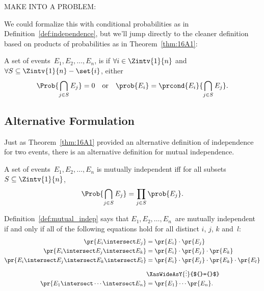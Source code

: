\begin{editingnotes}
MAKE INTO A PROBLEM:

We could formalize this with conditional probabilities
as in Definition~\ref{def:independence}, but we'll jump directly to
the cleaner definition based on products of probabilities as in
Theorem~\ref{thm:16A1}:

\begin{definition}\label{def:mutual_independence}
A set of events~$E_1, E_2, \dots, E_n$, is 
if $\forall i \in \Zintv{1}{n}$ and $\forall S \subseteq \Zintv{1}{n} - \set{i}$,
either
\begin{equation*}
    \Prob{\bigcap_{j \in S} E_j} = 0
\quad
\text{or}
\quad
    \prob{E_i} = \prcond{E_i}{\bigcap_{j \in S} E_j}.
\end{equation*}
\end{definition}

\subsection{Alternative Formulation}

Just as Theorem~\ref{thm:16A1} provided an alternative definition of
independence for two events, there is an alternative definition for
mutual independence.


\begin{definition}\label{def:mutual_indep}
A set of events~$E_1, E_2, \dots, E_n$ is mutually independent iff
for all subsets $S \subseteq \Zintv{1}{n}$,
\begin{equation*}
    \Prob{\bigcap_{j \in S} E_j} = \prod_{j \in S} \prob{E_j}.
\end{equation*}
\end{definition}

Definition~\ref{def:mutual_indep} says that $E_1, E_2, \dots, E_n$~are
mutually independent if and only if all of the following equations
hold for all distinct $i$, $j$, $k$ and~$l$:
%
\begin{align*}
\pr{E_i \intersect E_j}
    & = \pr{E_i} \cdot \pr{E_j}
 \\
\pr{E_i \intersect E_j \intersect E_k}
    & = \pr{E_i} \cdot \pr{E_j} \cdot \pr{E_k}
 \\
\pr{E_i \intersect E_j \intersect E_k \intersect E_l}
    & = \pr{E_i} \cdot \pr{E_j} \cdot \pr{E_k} \cdot \pr{E_l}
 \\
    & \XasWideAsY{\vdots}{${}={}$} \\
\pr{E_1 \intersect \cdots \intersect E_n} & = \pr{E_1} \cdots \pr{E_n}.
\end{align*}


\end{editingnotes}
